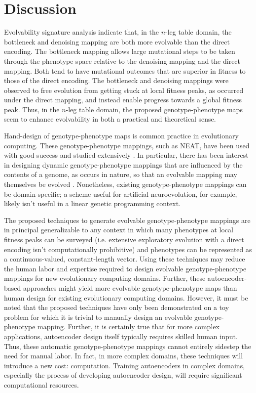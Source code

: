 \section{Discussion} \label{sec:discussion}

Evolvability signature analysis indicate that, in the $n$-leg table domain, the bottleneck and denoising mapping are both more evolvable than the direct encoding.
The bottleneck mapping allows large mutational steps to be taken through the phenotype space relative to the denoising mapping and the direct mapping.
Both tend to have mutational outcomes that are superior in fitness to those of the direct encoding.
The bottleneck and denoising mappings were observed to free evolution from getting stuck at local fitness peaks, as occurred under the direct mapping, and instead enable progress towards a global fitness peak.
Thus, in the $n$-leg table domain, the proposed genotype-phenotype maps seem to enhance evolvability in both a practical and theoretical sense.

Hand-design of genotype-phenotype maps is common practice in evolutionary computing.
These genotype-phenotype mappings, such as NEAT, have been used with good success and studied extensively \cite{stanley2002efficient}.
In particular, there has been interest in designing dynamic genotype-phenotype mappings that are influenced by the contents of a genome, as occurs in nature, so that an evolvable mapping may themselves be evolved \cite{reisinger2007acquiring}.
Nonetheless, existing genotype-phenotype mappings can be domain-specific;
a scheme useful for artificial neuroevolution, for example, likely isn't useful in a linear genetic programming context.

The proposed techniques to generate evolvable genotype-phenotype mappings are in principal generalizable to any context in which many phenotypes at local fitness peaks can be surveyed (i.e. extensive exploratory evolution with a direct encoding isn't computationally prohibitive) and phenotypes can be represented as a continuous-valued, constant-length vector.
Using these techniques may reduce the human labor and expertise required to design evolvable genotype-phenotype mappings for new evolutionary computing domains.
Further, these autoencoder-based approaches might yield more evolvable genotype-phenotype maps than human design for existing evolutionary computing domains.
However, it must be noted that the proposed techniques have only been demonstrated on a toy problem for which it is trivial to manually design an evolvable genotype-phenotype mapping.
Further, it is certainly true that for more complex applications, autoencoder design itself typically requires skilled human input.
Thus, these automatic genotype-phenotype mappings cannot entirely sidestep the need for manual labor.
In fact, in more complex domains, these techniques will introduce a new cost: computation.
Training autoencoders in complex domains, especially the process of developing autoencoder design, will require significant computational resources.

